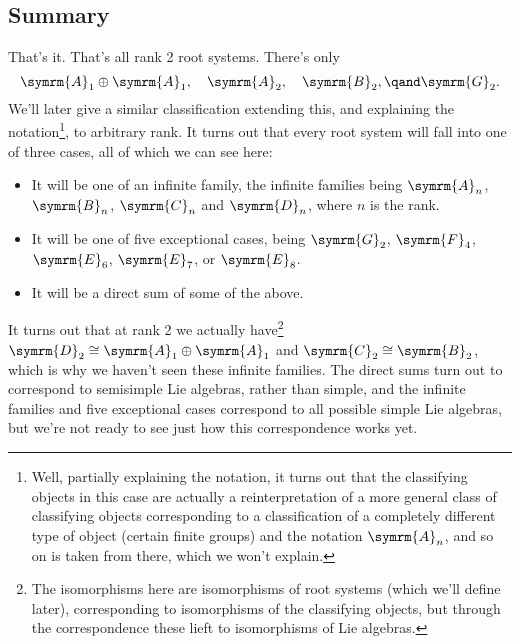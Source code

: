 \documentclass[fleqn]{NotesClass}
\newcommand{\isomorphic}{\cong}
\newcommand{\dynkin}[2]{\symrm{#1}_{#2}}
\begin{document}
    \subsection{Summary}
    That's it.
    That's all rank 2 root systems.
    There's only
    \begin{equation}
        \dynkin{A}{1} \oplus \dynkin{A}{1}, \quad \dynkin{A}{2}, \quad \dynkin{B}{2}, \qand \dynkin{G}{2}.
    \end{equation}
    We'll later give a similar classification extending this, and explaining the notation\footnote{Well, partially explaining the notation, it turns out that the classifying objects in this case are actually a reinterpretation of a more general class of classifying objects corresponding to a classification of a completely different type of object (certain finite groups) and the notation \(\dynkin{A}{n}\), and so on is taken from there, which we won't explain.}, to arbitrary rank.
    It turns out that every root system will fall into one of three cases, all of which we can see here:
    \begin{itemize}
        \item It will be one of an infinite family, the infinite families being \(\dynkin{A}{n}\), \(\dynkin{B}{n}\), \(\dynkin{C}{n}\) and \(\dynkin{D}{n}\), where \(n\) is the rank.
        \item It will be one of five exceptional cases, being \(\dynkin{G}{2}\), \(\dynkin{F}{4}\), \(\dynkin{E}{6}\), \(\dynkin{E}{7}\), or \(\dynkin{E}{8}\).
        \item It will be a direct sum of some of the above.
    \end{itemize}
    It turns out that at rank 2 we actually have\footnote{The isomorphisms here are isomorphisms of root systems (which we'll define later), corresponding to isomorphisms of the classifying objects, but through the correspondence these lieft to isomorphisms of Lie algebras.} \(\dynkin{D}{2} \isomorphic \dynkin{A}{1} \oplus \dynkin{A}{1}\) and \(\dynkin{C}{2} \isomorphic \dynkin{B}{2}\), which is why we haven't seen these infinite families.
    The direct sums turn out to correspond to semisimple Lie algebras, rather than simple, and the infinite families and five exceptional cases correspond to all possible simple Lie algebras, but we're not ready to see just how this correspondence works yet.
    
\end{document}
